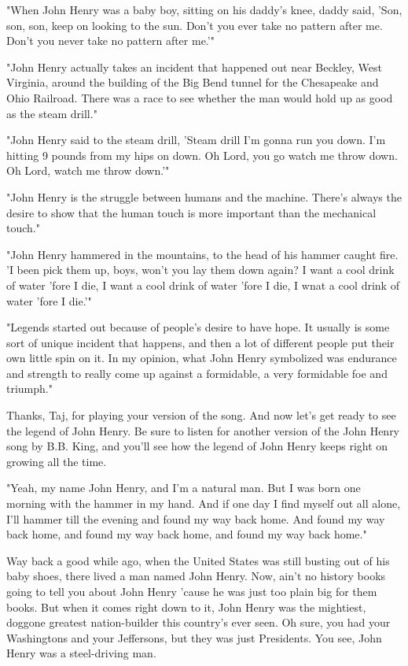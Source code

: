 "When John Henry was a baby boy, sitting on his daddy's knee, daddy said, 'Son, son, son, keep on looking to the sun. Don't you ever take no pattern after me. Don't you never take no pattern after me.'"

"John Henry actually takes an incident that happened out near Beckley, West Virginia, around the building of the Big Bend tunnel for the Chesapeake and Ohio Railroad. There was a race to see whether the man would hold up as good as the steam drill."

"John Henry said to the steam drill, 'Steam drill I'm gonna run you down. I'm hitting 9 pounds from my hips on down. Oh Lord, you go watch me throw down. Oh Lord, watch me throw down.'"

"John Henry is the struggle between humans and the machine. There's always the desire to show that the human touch is more important than the mechanical touch."

"John Henry hammered in the mountains, to the head of his hammer caught fire. 'I been pick them up, boys, won't you lay them down again? I want a cool drink of water 'fore I die, I want a cool drink of water 'fore I die, I wnat a cool drink of water 'fore I die.'"

"Legends started out because of people's desire to have hope. It usually is some sort of unique incident that happens, and then a lot of different people put their own little spin on it. In my opinion, what John Henry symbolized was endurance and strength to really come up against a formidable, a very formidable foe and triumph."

Thanks, Taj, for playing your version of the song. And now let's get ready to see the legend of John Henry. Be sure to listen for another version of the John Henry song by B.B. King, and you'll see how the legend of John Henry keeps right on growing all the time.

"Yeah, my name John Henry, and I'm a natural man. But I was born one morning with the hammer in my hand. And if one day I find myself out all alone, I'll hammer till the evening and found my way back home. And found my way back home, and found my way back home, and found my way back home."

Way back a good while ago, when the United States was still busting out of his baby shoes, there lived a man named John Henry. Now, ain't no history books going to tell you about John Henry 'cause he was just too plain big for them books. But when it comes right down to it, John Henry was the mightiest, doggone greatest nation-builder this country's ever seen. Oh sure, you had your Washingtons and your Jeffersons, but they was just Presidents. You see, John Henry was a steel-driving man.

